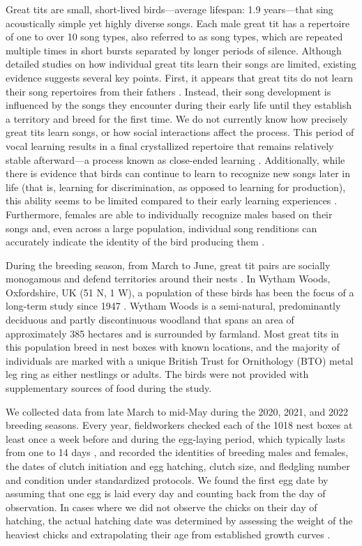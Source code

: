 \documentclass[9pt, onecolumn, twoside, lineno]{gsajnl}
\begin{document}
Great tits are small, short-lived birds---average lifespan: 1.9 years---that sing acoustically simple yet highly diverse songs. Each male great tit has a repertoire of one to over 10 song types, also referred to as song types, which are repeated multiple times in short bursts separated by longer periods of silence. Although detailed studies on how individual great tits learn their songs are limited, existing evidence suggests several key points. First, it appears that great tits do not learn their song repertoires from their fathers \autocite{mcgregor1982b}. Instead, their song development is influenced by the songs they encounter during their early life until they establish a territory and breed for the first time. We do not currently know how precisely great tits learn songs, or how social interactions affect the process. This period of vocal learning results in a final crystallized repertoire that remains relatively stable afterward---a process known as close-ended learning \autocite{rivera-gutierrez2011}. Additionally, while there is evidence that birds can continue to learn to recognize new songs later in life (that is, learning for  discrimination, as opposed to learning for production), this ability seems to be limited compared to their early learning experiences \autocite{mcgregor1986}. Furthermore, females are able to individually recognize males based on their songs \autocite{lind1996} and, even across a large population, individual song renditions can accurately indicate the identity of the bird producing them \autocite{merinorecalde2023a}.

During the breeding season, from March to June, great tit pairs are socially monogamous and defend territories around their nests \autocite{hinde1952}. In Wytham Woods, Oxfordshire, UK (51 N, 1 W), a population of these birds has been the focus of a long-term study since 1947 \autocite{lack1964}. Wytham Woods is a semi-natural, predominantly deciduous and partly discontinuous woodland that spans an area of approximately 385 hectares and is surrounded by farmland. Most great tits in this population breed in nest boxes with known locations, and the majority of individuals are marked with a unique British Trust for Ornithology (BTO) metal leg ring as either nestlings or adults. The birds were not provided with supplementary sources of food during the study.

We collected data from late March to mid-May during the 2020, 2021, and 2022 breeding seasons. Every year, fieldworkers checked each of the 1018 nest boxes at least once a week before and during the egg-laying period, which typically lasts from one to 14 days \autocite{Perrins1965}, and recorded the identities of breeding males and females, the dates of clutch initiation and egg hatching, clutch size, and fledgling number and condition under standardized protocols. We found the first egg date by assuming that one egg is laid every day and counting back from the day of observation. In cases where we did not observe the chicks on their day of hatching, the actual hatching date was determined by assessing the weight of the heaviest chicks and extrapolating their age from established growth curves \autocite{cresswell2003, gibb1950}.
\end{document}
